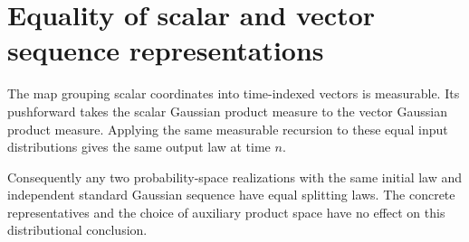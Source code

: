 \documentclass[11pt,a4paper]{article}
\begin{document}
\section{\texorpdfstring{Equality of scalar and vector sequence representations}{Equality of scalar and vector sequence representations}}


The map grouping scalar coordinates into time-indexed vectors is measurable. Its pushforward takes the scalar Gaussian product measure to the vector Gaussian product measure. Applying the same measurable recursion to these equal input distributions gives the same output law at time \(n\).



Consequently any two probability-space realizations with the same initial law and independent standard Gaussian sequence have equal splitting laws. The concrete representatives and the choice of auxiliary product space have no effect on this distributional conclusion.
\end{document}
